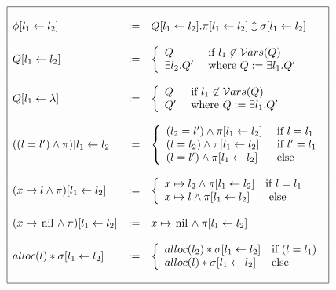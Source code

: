 \documentclass[a4paper,twoside,12pt]{report}
\newcommand{\Alloc}[1]{alloc(#1)}
\newcommand{\Unsep}[0]{\ast}
\newcommand{\Sep}[2]{#1 \Unsep #2}
\newcommand{\EqLoc}[2]{ (#1 = #2) }
\newcommand{\Andpure}[2]{ #1 \wedge #2}
\newcommand{\Pointsto}[2]{ #1 \mapsto #2}
\newcommand{\nil}[0]{\lstinline!nil!}
\newcommand{\Pointstonil}[1]{ #1 \mapsto \mbox{\nil}}
\newcommand{\Formula}[2]{ #1  \updownarrow #2}
\newcommand{\Vars}[1]{\mathcal{V}ars(#1)}
\newcommand{\Subst}[3]{#3\lbrack #1\leftarrow #2 \rbrack}
\begin{document}
\begin{definition}[Substitution]
$$
\begin{array}{|lll|}
\hline
&&\\
\Subst{l_1}{l_2}{\phi} &:=& \Subst{l_1}{l_2}{Q}.\Formula{\Subst{l_1}{l_2}{\pi}}{\Subst{l_1}{l_2}{\sigma}} \\
&&\\
\Subst{l_1}{l_2}{Q} &:=&
	 \left \{ 
		\begin{array} {ll}
			 Q   & \text{ if } l_1 \not\in \Vars{Q}\\
			\exists l_2 . Q^{\prime} & \text{ where } Q:=\exists l_1.Q^{\prime} 
	\end{array}
	\right .
\\
&&\\
\Subst{l_1}{\lambda}{Q} &:=&
	 \left \{ 
		\begin{array} {ll}
			 Q   & \text{ if } l_1 \not\in \Vars{Q}\\
			 Q^{\prime} & \text{ where } Q:=\exists l_1.Q^{\prime} 
	\end{array}
	\right .
\\
&&\\
\Subst{l_1}{l_2}{(\Andpure{\EqLoc{l}{l^{\prime}}}{\pi})} & := & \left 
	\{ \begin{array}{ll}
	\Andpure{\EqLoc{l_2}{l^{\prime}}}{\Subst{l_1}{l_2}{\pi}} & \mbox{ if } l=l_1 \\
	 \Andpure{\EqLoc{l}{l_2}}{\Subst{l_1}{l_2}{\pi}} & \mbox{ if } l^{\prime}=l_1 \\
	\Andpure{\EqLoc{l}{l^{\prime}}}{\Subst{l_1}{l_2}{\pi}} & \mbox{ else} 
	\end{array} \right .
\\
&&\\
\Subst{l_1}{l_2}{(\Andpure{\Pointsto{x}{l}}{\pi})}&:=& \left \{ \begin{array}{ll}
		\Andpure{\Pointsto{x}{l_2}}{\Subst{l_1}{l_2}{\pi}} & \mbox{if } l=l_1 \\	
		\Andpure{\Pointsto{x}{l}}{\Subst{l_1}{l_2}{\pi}} & \mbox{ else}
		\end{array} \right .
\\
&&\\
\Subst{l_1}{l_2}{(\Andpure{\Pointstonil{x}}{\pi})} &:=&  \Andpure{\Pointstonil{x}}{\Subst{l_1}{l_2}{\pi}}  
\\
&&\\
\Subst{l_1}{l_2}{\Sep{\Alloc{l}}{\sigma}} & := & \left \{ 
	\begin{array}{ll} 
		\Sep{\Alloc{l_2}}{\Subst{l_1}{l_2}{\sigma}} & \mbox{if } \EqLoc{l}{l_1} \\
		\Sep{\Alloc{l}}{\Subst{l_1}{l_2}{\sigma}} & \mbox{else } 
	\end{array} \right . \\
&&\\
\hline
		
\end{array}
$$

\end{definition}
\end{document}
